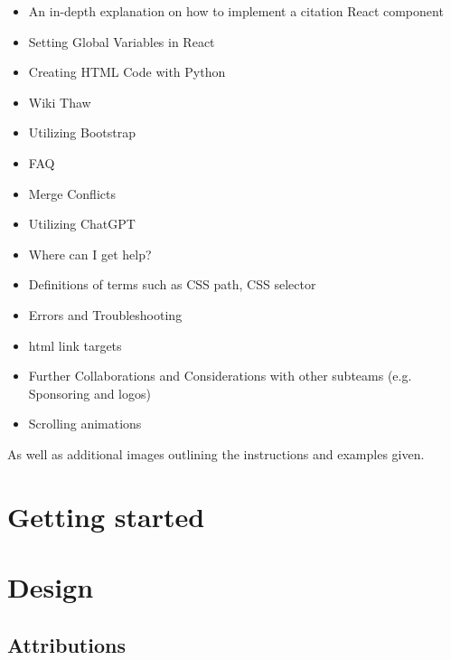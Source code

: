 \documentclass[a4paper, 11pt, twoside]{book}
\begin{document}
\begin{itemize}
    \item An in-depth explanation on how to implement a citation React component
    \item Setting Global Variables in React
    \item Creating HTML Code with Python
    \item Wiki Thaw
    \item Utilizing Bootstrap
    \item FAQ
    \item Merge Conflicts
    \item Utilizing ChatGPT
    \item Where can I get help?
    \item Definitions of terms such as CSS path, CSS selector
    \item Errors and Troubleshooting
    \item html link targets
    \item Further Collaborations and Considerations with other subteams (e.g. Sponsoring and logos)
    \item Scrolling animations
\end{itemize}
As well as additional images outlining the instructions and examples given.
\newpage

\mainmatter
\pagecolor{pagecolor}
\chapter{Getting started} \label{sec:started}
%
\newpage
\chapter{Design} \label{sec:design}
%
\newpage

\backmatter
\pagecolor{pagecolor}
\section*{Attributions}

\end{document}
